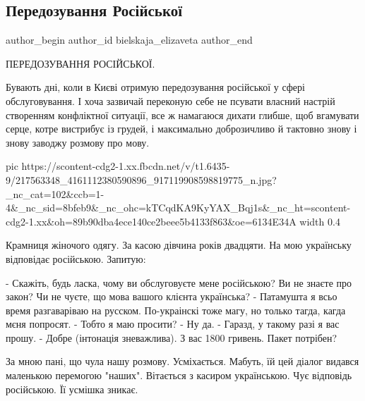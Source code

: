  
 
 
 
 
 
\subsection{Передозування Російської}
\label{sec:15_07_2021.fb.bielskaja_elizaveta.1.peredoz_rosijskoju}
 
\ifcmt
 author_begin
   author_id bielskaja_elizaveta
 author_end
\fi

ПЕРЕДОЗУВАННЯ РОСІЙСЬКОЇ.

Бувають дні, коли в Києві отримую передозування російської у сфері
обслуговування. І хоча зазвичай переконую себе не псувати власний настрій
створенням конфліктної ситуації, все ж намагаюся дихати глибше, щоб вгамувати
серце, котре вистрибує із грудей, і максимально доброзичливо й тактовно знову і
знову заводжу розмову про мову.

\ifcmt
  pic https://scontent-cdg2-1.xx.fbcdn.net/v/t1.6435-9/217563348_4161112380590896_917119908598819775_n.jpg?_nc_cat=102&ccb=1-4&_nc_sid=8bfeb9&_nc_ohc=kTCqdKA9KyYAX_Bqj1s&_nc_ht=scontent-cdg2-1.xx&oh=89b90dba4ece140ce2beee5b4133f863&oe=6134E34A
  width 0.4
\fi

Крамниця жіночого одягу. За касою дівчина років двадцяти. На мою українську
відповідає російською. Запитую:

\obeycr
- Скажіть, будь ласка, чому ви обслуговуєте мене російською? Ви не знаєте про закон? Чи не чуєте, що  мова вашого клієнта українська?
- Патамушта я всьо время разгаваріваю на русском. По-украінскі тоже магу, но только тагда, кагда мєня попросят.
- Тобто я маю просити?
- Ну да.
- Гаразд, у такому разі я вас прошу.
- Добре (інтонація зневажлива). З вас 1800 гривень. Пакет потрібен?
\restorecr

За мною пані, що чула нашу розмову. Усміхається. Мабуть, їй цей діалог видався
маленькою перемогою "наших". Вітається з касиром українською. Чує відповідь
російською. Її усмішка зникає.

